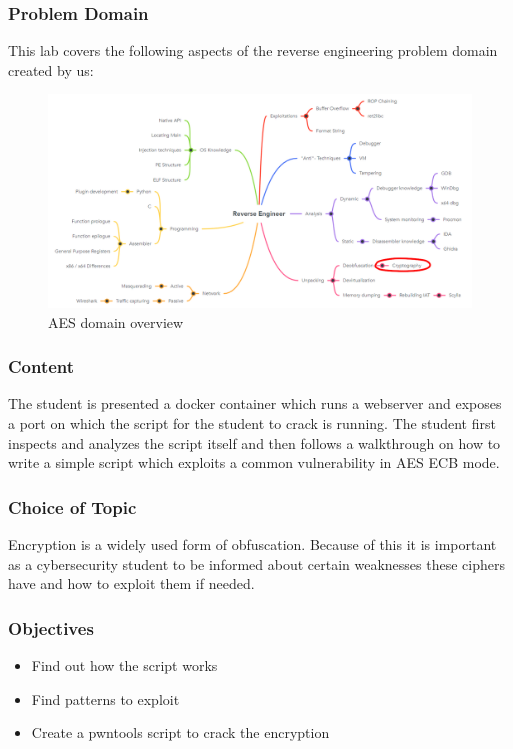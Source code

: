 \subsubsection*{Problem Domain}
This lab covers the following aspects of the reverse engineering problem domain created by us:
\vspace{-2ex}
\begin{figure}[H]
    \includegraphics[width=\textwidth]{resources/aes-overview-light.png}
    \caption{AES domain overview}
    \label{fig:aes-overview}
\end{figure}
\subsubsection*{Content}
The student is presented a docker container which runs a webserver and exposes a port on which the script for the student to crack is running. The student first inspects and analyzes the script itself and then follows a walkthrough on how to write a simple script which exploits a common vulnerability in AES ECB mode. 
\subsubsection*{Choice of Topic}
Encryption is a widely used form of obfuscation. Because of this it is important as a cybersecurity student to be informed about certain weaknesses these ciphers have and how to exploit them if needed. 
\subsubsection*{Objectives}
\begin{itemize}
    \item Find out how the script works
    \item Find patterns to exploit
    \item Create a pwntools script to crack the encryption
\end{itemize}
